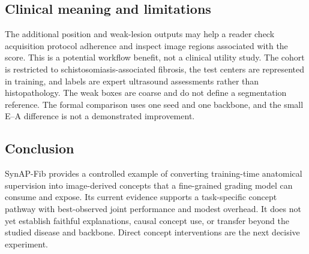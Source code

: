 \subsection{Clinical meaning and limitations}
The additional position and weak-lesion outputs may help a reader check acquisition protocol adherence and inspect image regions associated with the score. This is a potential workflow benefit, not a clinical utility study. The cohort is restricted to schistosomiasis-associated fibrosis, the test centers are represented in training, and labels are expert ultrasound assessments rather than histopathology. The weak boxes are coarse and do not define a segmentation reference. The formal comparison uses one seed and one backbone, and the small E--A difference is not a demonstrated improvement.

\subsection{Conclusion}
SynAP-Fib provides a controlled example of converting training-time anatomical supervision into image-derived concepts that a fine-grained grading model can consume and expose. Its current evidence supports a task-specific concept pathway with best-observed joint performance and modest overhead. It does not yet establish faithful explanations, causal concept use, or transfer beyond the studied disease and backbone. Direct concept interventions are the next decisive experiment.
